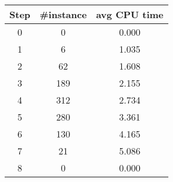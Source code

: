 \begin{tabular}{|c|c|c|}
Step & \#instance & avg CPU time \\ \hline
0 & 0 & 0.000 \\
1 & 6 & 1.035 \\
2 & 62 & 1.608 \\
3 & 189 & 2.155 \\
4 & 312 & 2.734 \\
5 & 280 & 3.361 \\
6 & 130 & 4.165 \\
7 & 21 & 5.086 \\
8 & 0 & 0.000 \\
\end{tabular}
